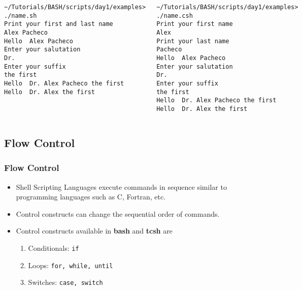 \documentclass[slidestop,mathserif,compress,xcolor=svgnames]{beamer}
\newenvironment{bblock}[0]
{
\begin{beamerboxesrounded}[upper=uppercol1,lower=lowercol1,shadow=true]}
{\end{beamerboxesrounded}}
\newenvironment{eblock}[0]
{
\begin{beamerboxesrounded}[upper=uppercol2,lower=lowercol2,shadow=true]}
{\end{beamerboxesrounded}}
\begin{document}
\begin{frame}
{\begin{columns}
    \end{columns}
    \begin{columns}
      \begin{eblock}{}
        \begin{lstlisting}[basicstyle=\fontsize{3.5}{4.5}\selectfont\ttfamily]
~/Tutorials/BASH/scripts/day1/examples> ./name.sh 
Print your first and last name
Alex Pacheco
Hello  Alex Pacheco
Enter your salutation
Dr.
Enter your suffix
the first
Hello  Dr. Alex Pacheco the first
Hello  Dr. Alex the first
        \end{lstlisting}
      \end{eblock}
      \begin{bblock}{}
        \begin{lstlisting}[basicstyle=\fontsize{3.5}{4.5}\selectfont\ttfamily]
~/Tutorials/BASH/scripts/day1/examples> ./name.csh 
Print your first name
Alex
Print your last name
Pacheco
Hello  Alex Pacheco
Enter your salutation
Dr.
Enter your suffix
the first
Hello  Dr. Alex Pacheco the first
Hello  Dr. Alex the first
        \end{lstlisting}
      \end{bblock}
    \end{columns}
  }
\end{frame}

\subsection{Flow Control}
\begin{frame}
  \frametitle{\small Flow Control}
  \begin{itemize}
    \item Shell Scripting Languages execute commands in sequence similar to programming languages such as C, Fortran, etc.
    \item Control constructs can change the sequential order of commands.
    \item Control constructs available in \textbf{bash} and \textbf{tcsh} are
    \begin{enumerate}
        \item Conditionals: \texttt{if}
        \item Loops: \texttt{for, while, until}
        \item Switches: \texttt{case, switch}
    \end{enumerate}
  \end{itemize}
\end{frame}
\end{document}
